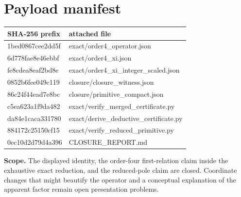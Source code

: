 \documentclass[9pt]{extarticle}
\begin{document}
\section*{Payload manifest}
{\footnotesize
\begin{tabularx}{\textwidth}{@{}>{\ttfamily}p{1.55in}>{\ttfamily}X@{}}
SHA-256 prefix & attached file\\\hline
1bed0867cee2dd5f & exact/order4\_operator.json\\
6d778fae8e46ebbf & exact/order4\_xi.json\\
fe8cdea8eaf2bd8e & exact/order4\_xi\_integer\_scaled.json\\
0852b6fee049c119 & closure/closure\_witness.json\\
86c24f44ead7e8bc & closure/primitive\_compact.json\\
c5ea623a1f9da482 & exact/verify\_merged\_certificate.py\\
da84e1caca331780 & exact/derive\_deductive\_certificate.py\\
884172c25150cf15 & exact/verify\_reduced\_primitive.py\\
0ec10d2d79d4a396 & CLOSURE\_REPORT.md
\end{tabularx}
}

\medskip
\textbf{Scope.} The displayed identity, the order-four first-relation claim
inside the exhaustive exact reduction, and the reduced-pole claim are closed.
Coordinate changes that might beautify the operator and a conceptual
explanation of the apparent factor remain open presentation problems.
\end{document}
